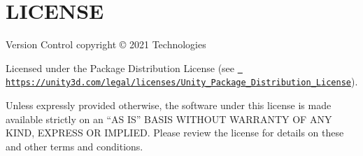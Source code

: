\chapter{LICENSE}
\hypertarget{md__hey_tea_9_2_library_2_package_cache_2com_8unity_8collab-proxy_0d2_80_85_2_l_i_c_e_n_s_e}{}\label{md__hey_tea_9_2_library_2_package_cache_2com_8unity_8collab-proxy_0d2_80_85_2_l_i_c_e_n_s_e}
Version Control copyright © 2021  Technologies

Licensed under the  Package Distribution License (see \href{https://unity3d.com/legal/licenses/Unity_Package_Distribution_License}{\texttt{ https\+://unity3d.\+com/legal/licenses/\+Unity\+\_\+\+Package\+\_\+\+Distribution\+\_\+\+License}}).

Unless expressly provided otherwise, the software under this license is made available strictly on an “\+AS IS” BASIS WITHOUT WARRANTY OF ANY KIND, EXPRESS OR IMPLIED. Please review the license for details on these and other terms and conditions. 